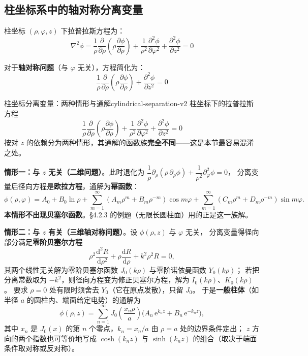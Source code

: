 \documentclass[11pt,a4paper,openany,oneside]{book}
\newcommand{\diff}{\mathrm{d}}
\newcommand{\ee}{\mathrm{e}}
\newcommand{\lap}{\nabla^2}
\begin{document}
\subsection{柱坐标系中的轴对称分离变量}

柱坐标 $(\rho,\varphi,z)$ 下拉普拉斯方程为：
\[
\lap\phi = \frac{1}{\rho}\frac{\partial}{\partial\rho}\left(\rho\frac{\partial\phi}{\partial\rho}\right)
+ \frac{1}{\rho^2}\frac{\partial^2\phi}{\partial\varphi^2}
+ \frac{\partial^2\phi}{\partial z^2} = 0
\]

对于\textbf{轴对称问题}（与 $\varphi$ 无关），方程简化为：
\[
\frac{1}{\rho}\frac{\partial}{\partial\rho}\left(\rho\frac{\partial\phi}{\partial\rho}\right)
+ \frac{\partial^2\phi}{\partial z^2} = 0
\]

\begin{theorem}{柱坐标分离变量：两种情形与通解}{cylindrical-separation-v2}
柱坐标下的拉普拉斯方程
\[
\frac{1}{\rho}\frac{\partial}{\partial\rho}\left(\rho\frac{\partial\phi}{\partial\rho}\right)
+ \frac{1}{\rho^2}\frac{\partial^2\phi}{\partial\varphi^2}
+ \frac{\partial^2\phi}{\partial z^2} = 0
\]
按对 $z$ 的依赖分为两种情形，其通解的函数族\textbf{完全不同}——这是本节最容易混淆之处。

\textbf{情形一：与 $z$ 无关（二维问题）}。此时退化为
$\dfrac{1}{\rho}\partial_\rho(\rho\,\partial_\rho\phi) + \dfrac{1}{\rho^2}\partial^2_\varphi\phi = 0$，
分离变量后径向方程是\textbf{欧拉方程}，通解为\textbf{幂函数}：
\begin{equation}
\phi(\rho,\varphi) = A_0 + B_0\ln\rho
+ \sum_{m=1}^{\infty}\left(A_m\rho^m + B_m\rho^{-m}\right)\cos m\varphi
+ \sum_{m=1}^{\infty}\left(C_m\rho^m + D_m\rho^{-m}\right)\sin m\varphi .
\label{eq:cyl-2d}
\end{equation}
\textbf{本情形不出现贝塞尔函数}。§4.2.3 的例题（无限长圆柱面）用的正是这一族解。

\textbf{情形二：与 $z$ 有关（三维轴对称问题）}。设 $\phi(\rho,z)$ 与 $\varphi$ 无关，
分离变量得径向部分满足\textbf{零阶贝塞尔方程}
\begin{equation}
\rho^2\frac{\diff^2 R}{\diff\rho^2} + \rho\frac{\diff R}{\diff\rho} + k^2\rho^2 R = 0,
\label{eq:bessel0}
\end{equation}
其两个线性无关解为零阶贝塞尔函数 $J_0(k\rho)$ 与零阶诺依曼函数 $Y_0(k\rho)$；
若把分离常数取为 $-k^2$，则径向方程变为修正贝塞尔方程，解为 $I_0(k\rho)$、$K_0(k\rho)$。
要求 $\rho=0$ 处有限时须舍去 $Y_0$（它在原点发散），只留 $J_0$。
于是\textbf{一般柱体}（如半径 $a$ 的圆柱内、端面给定电势）的通解为
\begin{equation}
\phi(\rho,z) = \sum_{n=1}^{\infty} J_0\!\left(\frac{x_n \rho}{a}\right)
\Big(A_n\,\ee^{k_n z} + B_n\,\ee^{-k_n z}\Big),
\label{eq:cyl-3d}
\end{equation}
其中 $x_n$ 是 $J_0(x)$ 的第 $n$ 个零点，$k_n = x_n/a$ 由 $\rho=a$ 处的边界条件定出；
$z$ 方向的两个指数也可等价地写成 $\cosh(k_n z)$ 与 $\sinh(k_n z)$ 的组合（取决于端面条件取对称或反对称）。


\end{theorem}
\end{document}
